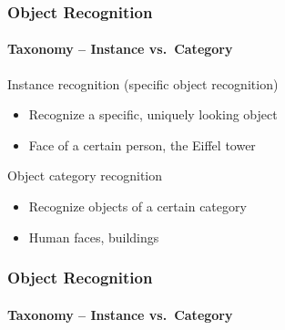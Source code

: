 \documentclass[xetex,professionalfont]{beamer}
\renewcommand\emph[1]{\textcolor{tuwcvl_inf_red}{#1}}
\begin{document}
\begin{frame}
\frametitle{Object Recognition}
\framesubtitle{Taxonomy -- Instance vs.\ Category}

\emph{Instance recognition} (\emph{specific object recognition})
\begin{itemize}
	\item Recognize a specific, uniquely looking object %
	\item Face of a certain person, the Eiffel tower
\end{itemize}

\bigskip
\emph{Object category recognition}
\begin{itemize}
	\item Recognize objects of a certain category %
	\item Human faces, buildings
\end{itemize}

\end{frame}


\begin{frame}
\frametitle{Object Recognition}
\framesubtitle{Taxonomy -- Instance vs.\ Category}

\begin{center}
\end{center}

\end{frame}
\end{document}
